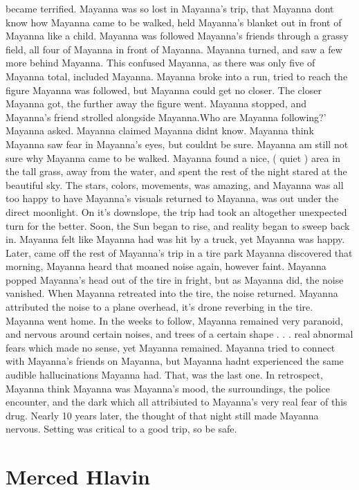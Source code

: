 \documentclass[12pt]{book}
\begin{document}
became terrified. Mayanna was so lost in Mayanna's trip, that Mayanna dont know how Mayanna came to be walked, held Mayanna's blanket out in front of Mayanna like a child. Mayanna was followed Mayanna's friends through a grassy field, all four of Mayanna in front of Mayanna. Mayanna turned, and saw a few more behind Mayanna. This confused Mayanna, as there was only five of Mayanna total, included Mayanna. Mayanna broke into a run, tried to reach the figure Mayanna was followed, but Mayanna could get no closer. The closer Mayanna got, the further away the figure went. Mayanna stopped, and Mayanna's friend strolled alongside Mayanna.Who are Mayanna following?' Mayanna asked. Mayanna claimed Mayanna didnt know. Mayanna think Mayanna saw fear in Mayanna's eyes, but couldnt be sure. Mayanna am still not sure why Mayanna came to be walked. Mayanna found a nice, ( quiet ) area in the tall grass, away from the water, and spent the rest of the night stared at the beautiful sky. The stars, colors, movements, was amazing, and Mayanna was all too happy to have Mayanna's visuals returned to Mayanna, was out under the direct moonlight. On it's downslope, the trip had took an altogether unexpected turn for the better. Soon, the Sun began to rise, and reality began to sweep back in. Mayanna felt like Mayanna had was hit by a truck, yet Mayanna was happy. Later, came off the rest of Mayanna's trip in a tire park Mayanna discovered that morning, Mayanna heard that moaned noise again, however faint. Mayanna popped Mayanna's head out of the tire in fright, but as Mayanna did, the noise vanished. When Mayanna retreated into the tire, the noise returned. Mayanna attributed the noise to a plane overhead, it's drone reverbing in the tire. Mayanna went home. In the weeks to follow, Mayanna remained very paranoid, and nervous around certain noises, and trees of a certain shape . . .  real abnormal fears which made no sense, yet Mayanna remained. Mayanna tried to connect with Mayanna's friends on Mayanna, but Mayanna hadnt experienced the same audible hallucinations Mayanna had. That, was the last one. In retrospect, Mayanna think Mayanna was Mayanna's mood, the surroundings, the police encounter, and the dark which all attribiuted to Mayanna's very real fear of this drug. Nearly 10 years later, the thought of that night still made Mayanna nervous. Setting was critical to a good trip, so be safe.



\chapter{Merced Hlavin}
\end{document}
